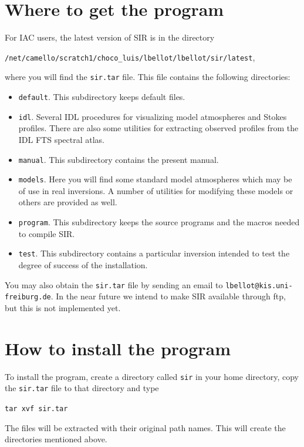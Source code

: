 \documentclass[11pt]{report}
\begin{document}
\section{Where to get the program}
For IAC users, the latest version of SIR is in the directory
\begin{center}
{\tt /net/camello/scratch1/choco\_luis/lbellot/lbellot/sir/latest},
\end{center}
where you will find the {\tt sir.tar} file. This file contains the following 
directories: 
\begin{itemize}
\item {\tt default}. This subdirectory keeps default files. 
\item {\tt idl}. Several IDL procedures for visualizing model atmospheres
and Stokes profiles. There are also some utilities for extracting observed
profiles from the IDL FTS spectral atlas.
\item {\tt manual}. This subdirectory contains the present manual.
\item {\tt models}. Here you will find some standard model atmospheres
which may be of use in real inversions. A number of utilities for modifying
these models or others are provided as well.
\item {\tt program}. This subdirectory keeps the source programs and the
macros needed to compile SIR.
\item {\tt test}. This subdirectory contains a particular inversion intended
to test the degree of success of the installation. 
\end{itemize}

You may also obtain the {\tt sir.tar} file by sending an email to
{\tt lbellot@kis.uni-freiburg.de}. In the near future we intend to make SIR available
through ftp, but this is not implemented yet.

\section{How to install the program}
To install the program, create a directory called {\tt sir} in your home
directory, copy the {\tt sir.tar} file to that directory and type
\begin{flushleft}
{\tt tar xvf sir.tar}
\end{flushleft}
The files will be extracted with their original path names. This will
create the directories mentioned above.
\end{document}
